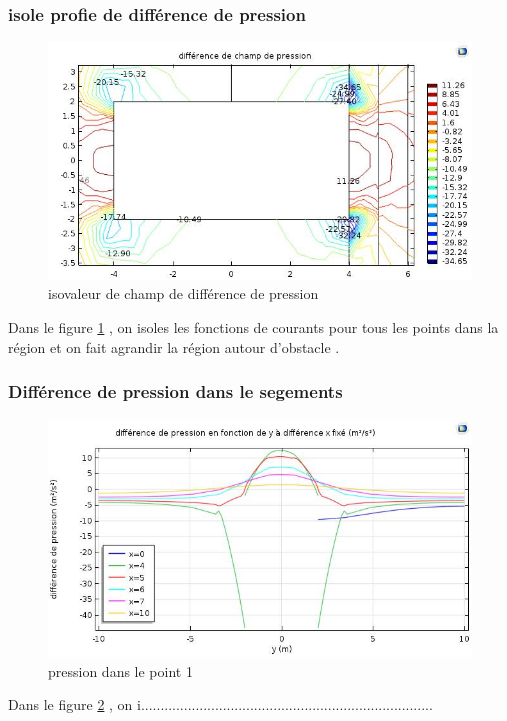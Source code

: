 \documentclass[a4paper,11pt]{report} %
\begin{document}
\subsubsection{isole profie de différence de pression}
\begin{figure}[!h]
\centering
\hspace*{0mm}\vfill
\begin{center} \includegraphics[width=1.\textwidth]{iso_pression_surface.jpg} \end{center}
\vfill\hspace*{0mm}
\caption{isovaleur de champ de différence de pression }
\label{pression_surface_iso}
\end{figure}\pagebreak
Dans le figure \ref{pression_surface_iso} , on isoles les fonctions de courants pour tous les points dans la région et on fait agrandir la région autour d'obstacle  . 

\subsubsection{Différence de pression dans le segements}
\begin{figure}[!h]
\centering
\hspace*{0mm}\vfill
\begin{center} \includegraphics[width=1.\textwidth]{pression_segment.jpg} \end{center}
\vfill\hspace*{0mm}
\caption{pression dans le point 1 }
\label{pression_ponctuel1}
\end{figure}\pagebreak
Dans le figure \ref{pression_ponctuel1} , on i...........................................................................
\end{document}

